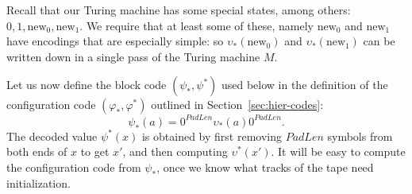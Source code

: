 \documentclass[11pt]{memoir}
\theoremstyle{definition} %
\newcommand{\PadLen}{\mathit{PadLen}} %
\newcommand{\new}{\mathrm{new}}
\begin{document}
 Recall that our Turing machine has some special states, among others: \( 0,1,\new_{0},\new_{1} \).
We require that at least some of these, namely \( \new_{0} \) and \( \new_{1} \) have encodings
that are especially simple: so \( \upsilon_{*}(\new_{0}) \) and \( \upsilon_{*}(\new_{1}) \) can be
written down in a single pass of the Turing machine \( M \).

Let us now define the block code \( (\psi_{*}, \psi^{*}) \) used below in the
definition of the configuration code \( (\varphi_{*}, \varphi^{*}) \)  
outlined in Section~\ref{sec:hier-codes}:
\begin{equation}\label{eq:psi}
   \psi_{*}(a)  = 0^{\PadLen}\upsilon_{*}(a)0^{\PadLen}.
\end{equation}
The decoded value \( \psi^{*}(x) \) is obtained by first removing \( \PadLen \)
symbols from both ends of \( x \) to get \( x' \), and then computing \(
\upsilon^{*}(x') \).
 It will be easy to compute the configuration code from \( \psi_{*} \),
once we know what tracks of the tape need initialization.




\end{document}
